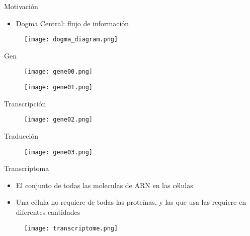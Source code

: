 \documentclass{beamer}
\begin{document}
\begin{frame}{Motivación}
\begin{itemize}
\item Dogma Central: flujo de información
\end{itemize}
\begin{figure}[H]
\centering
\texttt{[image: dogma\_diagram.png]}
\end{figure}
\end{frame}





\begin{frame}{Gen}
\begin{figure}[H]
\centering
\texttt{[image: gene00.png]}
\end{figure}
\begin{figure}[H]
\centering
\texttt{[image: gene01.png]}
\end{figure}
\end{frame}

\begin{frame}{Transcripción}
\begin{figure}[H]
\centering
\texttt{[image: gene02.png]}
\end{figure}
\end{frame}

\begin{frame}{Traducción}
\begin{figure}[H]
\centering
\texttt{[image: gene03.png]}
\end{figure}
\end{frame}

\begin{frame}{Transcriptoma}
\begin{itemize}
\item El conjunto de todas las moleculas de ARN en las células
\item Una célula no requiere de todas las proteínas, y las que usa las requiere en diferentes cantidades
\end{itemize}
\begin{figure}[H]
\centering
\texttt{[image: transcriptome.png]}
\end{figure}
\end{frame}
\end{document}
